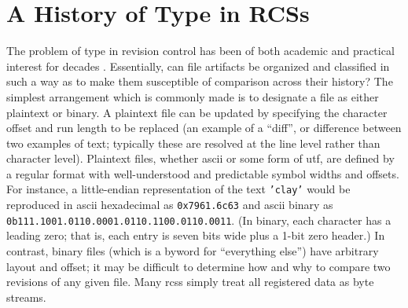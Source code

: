 \documentclass[twoside]{article}
\begin{document}
\section[{A History of Type in {\sc rcs}s}]{A History of Type in RCSs}

The problem of type in revision control has been of both academic and practical interest for decades \citep{Perry1987}.  Essentially, can file artifacts be organized and classified in such a way as to make them susceptible of comparison across their history?  The simplest arrangement which is commonly made is to designate a file as either plaintext or binary.  A plaintext file can be updated by specifying the character offset and run length to be replaced (an example of a “diff”, or difference between two examples of text; typically these are resolved at the line level rather than character level).  Plaintext files, whether {\sc ascii} or some form of {\sc utf}, are defined by a regular format with well-understood and predictable symbol widths and offsets.  For instance, a little-endian representation of the text \texttt{'clay'} would be reproduced in {\sc ascii} hexadecimal as \texttt{0x7961.6c63} and {\sc ascii} binary as \texttt{0b111.1001.0110.0001.0110.1100.0110.0011}.  (In binary, each character has a leading zero; that is, each entry is seven bits wide plus a 1-bit zero header.)  In contrast, binary files (which is a byword for “everything else”) have arbitrary layout and offset; it may be difficult to determine how and why to compare two revisions of any given file.  Many {\sc rcs}s simply treat all registered data as byte streams.
\end{document}
